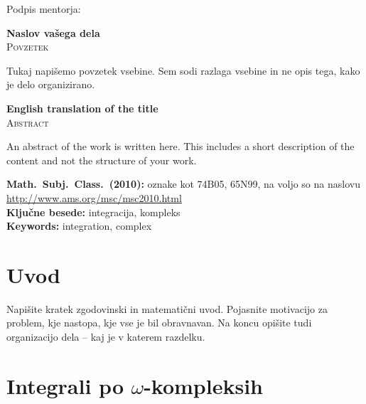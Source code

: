 \documentclass[12pt,a4paper,twoside]{article}
\newcommand{\naslovdela}{Naslov vašega dela}
\newcommand{\kljucnebesede}{integracija\sep kompleks} %
\newcommand{\keywords}{integration\sep complex} %
\newcommand{\sep}{, }  %
\theoremstyle{definition} %
\theoremstyle{plain} %
\numberwithin{equation}{section}  %
\begin{document}
\vspace{2cm}
\hspace*{\fill} Podpis mentorja: \phantom{prostor za podpis}


\cleardoublepage
{}

\begin{center}
\textbf{\naslovdela} \\[3mm]
\textsc{Povzetek} \\[2mm]
\end{center}
Tukaj napišemo povzetek vsebine. Sem sodi razlaga vsebine in ne opis tega, kako je delo
organizirano.

\vfill
\begin{center}
\textbf{English translation of the title} \\[3mm] %
\textsc{Abstract}\\[2mm]
\end{center}

An abstract of the work is written here. This includes a short description of
the content and not the structure of your work.

\vfill\noindent
\textbf{Math.~Subj.~Class.~(2010):} oznake kot 74B05, 65N99, na voljo so na naslovu
\url{http://www.ams.org/msc/msc2010.html} \\[1mm]
\textbf{Ključne besede:} \kljucnebesede \\[1mm]
\textbf{Keywords:} \keywords

\cleardoublepage

\setcounter{page}{1}    %

\section{Uvod}
Napišite kratek zgodovinski in matematični uvod.  Pojasnite motivacijo za problem, kje
nastopa, kje vse je bil obravnavan. Na koncu opišite tudi organizacijo dela -- kaj je v
katerem razdelku.

\section{Integrali po \texorpdfstring{$\omega$}{ω}-kompleksih}
\end{document}
